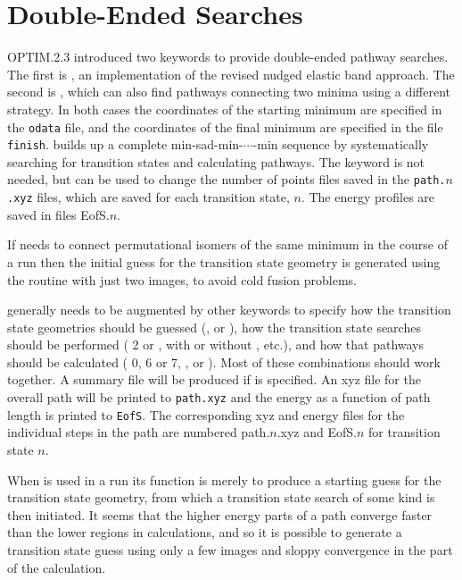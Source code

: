 {{{\section{Double-Ended Searches}
\label{sec:double}
OPTIM.2.3 introduced two keywords to provide double-ended pathway searches.
The first is , 
an implementation of the revised nudged elastic band approach.\cite{HenkelmanJ00,HenkelmanUJ00}
The second is , which can also find pathways connecting two minima using a different
strategy. In both cases the coordinates of the starting minimum are specified in the {\tt odata} file,
and the coordinates of the final minimum are specified in the file {\tt finish}.
 builds up a complete min-sad-min-$\cdots$-min sequence by systematically 
searching for transition
states and calculating pathways. The  keyword is not needed, but can be used to change the
number of points files saved in the {\tt path.$n$.xyz} files, which are saved for each transition state, $n$.
The energy profiles are saved in files EofS.$n$.

If  needs to connect permutational isomers of the same minimum in the
course of a run then the initial guess for the transition state geometry is generated
using the  routine with just two images, to avoid cold fusion problems.

 generally needs to be augmented by other keywords to specify how the transition
state geometries should be guessed (,
 or {}), how the transition
state searches should be performed ({ 2\/} or {}, with or
without {}, {} etc.), and how that pathways should be
calculated ({ 0,\/} 6 or 7, {}, {} or {}).
Most of these combinations should work together.
A summary file will be produced if {} is specified. An xyz file
for the overall path will be printed to {\tt path.xyz} and the energy as a
function of path length is printed to {\tt EofS}. The corresponding xyz and energy
files for the individual steps in the path are numbered path.$n$.xyz and EofS.$n$ for
transition state $n$.

When  is used in a  run its function is merely to produce a
starting guess for the transition state geometry, from which a transition state search
of some kind is then initiated. It seems that the higher energy parts of a path converge 
faster than the lower regions in  calculations, and so it is possible to generate
a transition state guess using only a few images and sloppy convergence in the 
part of the calculation.

}}}
